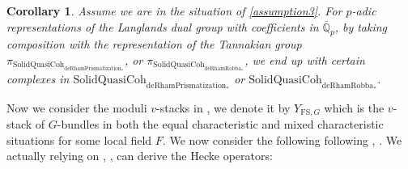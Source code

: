 \documentclass[12pt]{article}
\newtheorem{corollary}{Corollary}
\theoremstyle{definition}
\begin{document}
\begin{corollary}
Assume we are in the situation of \cref{assumption3}. For $p$-adic representations of the Langlands dual group with coefficients in $\overline{\mathbb{Q}}_p$, by taking composition with the representation of the Tannakian group $\pi_{\mathrm{SolidQuasiCoh}_{\mathrm{deRhamPrismatization}_*}}$, or $\pi_{\mathrm{SolidQuasiCoh}_{\mathrm{deRhamRobba}_*}}$, we end up with certain complexes in $\mathrm{SolidQuasiCoh}_{\mathrm{deRhamPrismatization}_*}$ or $\mathrm{SolidQuasiCoh}_{\mathrm{deRhamRobba}_*}$.
\end{corollary}

 
\indent Now we consider the moduli $v$-stacks in \cite{1FS}, we denote it by $Y_{\mathrm{FS},G}$ which is the $v$-stack of $G$-bundles in both the equal characteristic and mixed characteristic situations for some local field $F$. We now consider the following following \cite{1FS}, \cite{1GL}. We actually relying on \cite{1FS}, \cite{1S5}, \cite{1S6}  can derive the Hecke operators:
\end{document}
